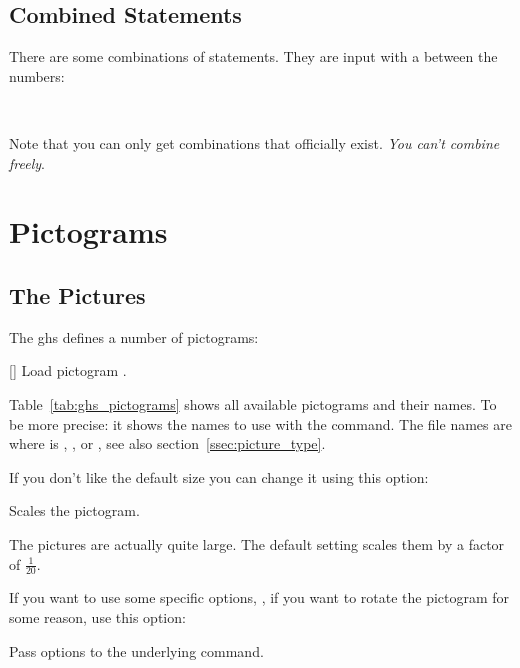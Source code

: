 \documentclass[load-preamble+]{cnltx-doc}
\begin{document}
\subsection{Combined Statements}
There are some combinations of statements.  They are input with a \code{+}
between the numbers:
\begin{example}
   \\
\end{example}

Note that you can only get combinations that officially exist.  \emph{You
  can't combine freely}.

\section{Pictograms}
\subsection{The Pictures}
The \ac{ghs} defines a number of pictograms:

    
   

\begin{commands}
  []
    Load pictogram .
\end{commands}
Table~\ref{tab:ghs_pictograms} shows all available pictograms and their names.
To be more precise: it shows the names to use with the  command.
The file names are  where
 is , ,  or , see also
section~\ref{ssec:picture_type}.
\begin{example}
\end{example}

If you don't like the default size you can change it using this option:
\begin{options}
    Scales the pictogram.
\end{options}
The pictures are actually quite large.  The default setting scales them by a
factor of $\frac{1}{20}$.
\begin{example}
\end{example}

If you want to use some specific  options, \eg, if
you want to rotate the pictogram for some reason, use this option:
\begin{options}
    Pass options to the underlying  command.
\end{options}
\begin{example}
\end{example}
\end{document}
